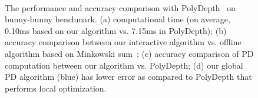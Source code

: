 \begin{figure}[htb]
  \centering
  \\
  \caption[The performance and accuracy comparison between learning-based PD algorithm and PolyDepth on bunny-bunny benchmark]{The performance and accuracy comparison with PolyDepth~\protect\cite{Je:2012:PRP} on bunny-bunny benchmark. (a) computational time (on average, 0.10ms based on our algorithm vs. 7.15ms in PolyDepth); (b) accuracy comparison between our interactive algorithm vs. offline algorithm based on Minkowski sum~\protect\cite{Lien:2009:ASM}; (c) accuracy comparison of PD computation between our algorithm vs. PolyDepth; (d) our global PD algorithm (blue) has lower error as compared to PolyDepth that performs local optimization. }\label{fig:2:bunnymodels}
\end{figure}

